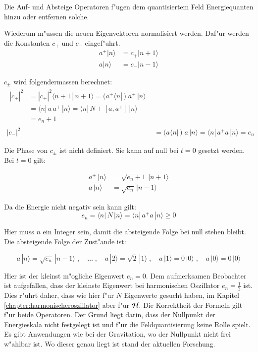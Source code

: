 Die Auf- und Absteige Operatoren f"ugen dem quantisiertem Feld Energiequanten hinzu oder entfernen solche.

Wiederum m"ussen die neuen Eigenvektoren normalisiert werden. Daf"ur werden die Konstanten $c_+$ und $c_-$ eingef"uhrt.
\begin{align*}
a^+|n\rangle &= c_+|n+1\rangle \\
a|n\rangle &= c_-|n-1\rangle
\end{align*}

$c_\pm$ wird folgendermassen berechnet:
\begin{align*}
\begin{split}
	|c_+|^2 &= |c_+|^2 \langle n+1 \, | \, n+1 \rangle = ( a^+ \langle n |\,) \; a^+ \,| n \rangle \\
		&= \langle n |\, a \, a^+ \,|n \rangle = \langle n |\, N + [a,a^+] \,|n \rangle \\
		&= e_n+1
\end{split}\\
	|c_-|^2 &= 	( a \langle n |\,) \; a \,| n \rangle = \langle n |\, a^+ a \,| n \rangle = e_n
\end{align*}

Die Phase von $c_{\pm}$ ist nicht definiert. Sie kann auf null bei $t=0$ gesetzt werden. Bei $t=0$ gilt:

\begin{align*}
a^+\,|n\rangle &= \sqrt{e_n+1}\,|n+1\rangle \\
a\,|n\rangle &= \sqrt{e_n}\,|n-1\rangle
\end{align*}

Da die Energie nicht negativ sein kann gilt:
\begin{equation*}
e_n = \langle n |\, N \,|n \rangle = \langle n |\, a^+a \,|n \rangle \geq 0
\end{equation*}

Hier muss $n$ ein Integer sein, damit die absteigende Folge bei null stehen bleibt. Die absteigende Folge der Zust"ande ist:

\begin{equation*}
a\,|n\rangle = \sqrt{e_n}\,|n-1\rangle  \;, \quad \hdots \; , \quad a\,|2\rangle = \sqrt{2}\,|1\rangle \; , \quad a\,|1\rangle = 0\,|0\rangle \;, \quad a\,|0\rangle = 0\,|0\rangle
\end{equation*}

Hier ist der kleinst m"ogliche Eigenwert $e_n = 0$. Dem aufmerksamen Beobachter ist aufgefallen, dass der kleinste Eigenwert bei harmonischen Oszillator $e_n = \frac{1}{2}$ ist. Dies r"uhrt daher, dass wie hier f"ur $N$ Eigenwerte gesucht haben, im Kapitel \ref{chapter:harmonischeroszillator} aber f"ur ${\cal H}$. Die Korrektheit der Formeln gilt f"ur beide Operatoren. Der Grund liegt darin, dass der Nullpunkt der Energieskala nicht festgelegt ist und f"ur die Feldquantisierung keine Rolle spielt. Es gibt Anwendungen wie bei der Gravitation, wo der Nullpunkt nicht frei w"ahlbar ist. Wo dieser genau liegt ist stand der aktuellen Forschung.

